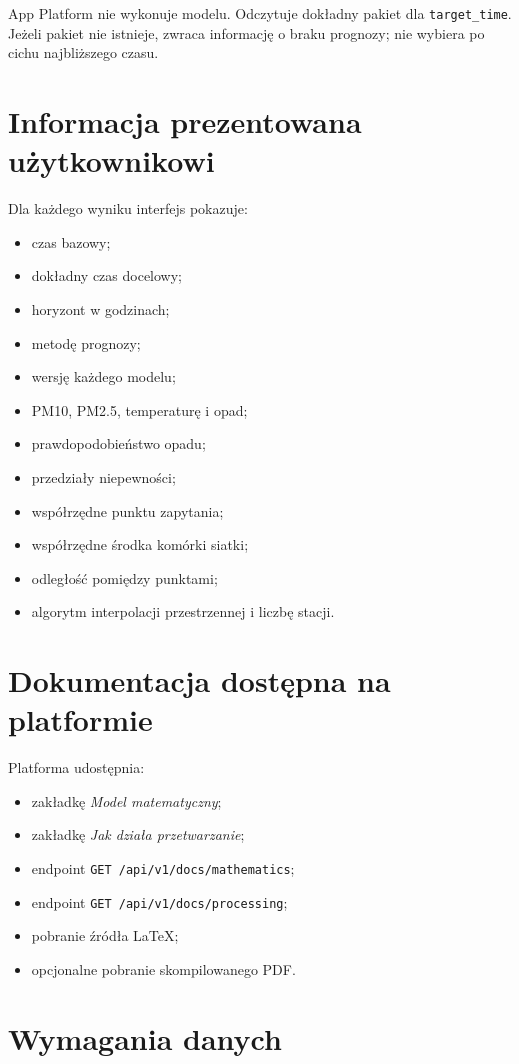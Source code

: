 \documentclass[11pt,a4paper,oneside]{article}
\begin{document}
App Platform nie wykonuje modelu. Odczytuje dokładny pakiet dla
\texttt{target\_time}. Jeżeli pakiet nie istnieje, zwraca informację o braku
prognozy; nie wybiera po cichu najbliższego czasu.

\section{Informacja prezentowana użytkownikowi}

Dla każdego wyniku interfejs pokazuje:
\begin{itemize}[nosep]
  \item czas bazowy;
  \item dokładny czas docelowy;
  \item horyzont w godzinach;
  \item metodę prognozy;
  \item wersję każdego modelu;
  \item PM10, PM2.5, temperaturę i opad;
  \item prawdopodobieństwo opadu;
  \item przedziały niepewności;
  \item współrzędne punktu zapytania;
  \item współrzędne środka komórki siatki;
  \item odległość pomiędzy punktami;
  \item algorytm interpolacji przestrzennej i liczbę stacji.
\end{itemize}

\section{Dokumentacja dostępna na platformie}

Platforma udostępnia:
\begin{itemize}[nosep]
  \item zakładkę \emph{Model matematyczny};
  \item zakładkę \emph{Jak działa przetwarzanie};
  \item endpoint \texttt{GET /api/v1/docs/mathematics};
  \item endpoint \texttt{GET /api/v1/docs/processing};
  \item pobranie źródła \LaTeX;
  \item opcjonalne pobranie skompilowanego PDF.
\end{itemize}

\section{Wymagania danych}
\end{document}
